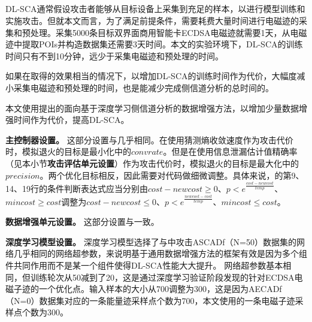 {{	\subsection{\shujuzengqiang}\label{subs:useagmt}
	DL-SCA通常假设攻击者能够从目标设备上采集到充足的样本，以进行模型训练和实施攻击。但就本文而言，为了满足前提条件，需要耗费大量时间进行电磁迹的采集和预处理。采集5000条目标双界面商用智能卡ECDSA电磁迹就需要1天，从电磁迹中提取POIs并构造数据集还需要3天时间。本文的实验环境下，DL-SCA的训练时间只有不到10分钟，远少于采集电磁迹和预处理的时间。
	
	如果在取得的效果相当的情况下，以增加DL-SCA的训练时间作为代价，大幅度减小采集电磁迹和预处理的时间，也是能减少完成侧信道分析的总时间的。
	
	本文使用提出的面向基于深度学习侧信道分析的数据增强方法，以增加少量数据增强时间作为代价，提高DL-SCA\zyx 。
	
	\textbf{主控制器设置。}
	这部分设置与几乎相同。在使用猜测熵收敛速度作为攻击代价时，模拟退火的目标是最小化中的$convrate$。但是在使用信息泄漏估计值精确率（见本小节\textbf{攻击评估单元设置}）作为攻击代价时，模拟退火的目标是最大化中的$precision$。两个优化目标相反，因此需要对代码做细微调整。具体来说，的第9、14、19行的条件判断表达式应当分别由$cost-newcost\ge0$、$p<e^{\frac{cost-newcost}{temp}}$、$mincost\ge cost$调整为$cost-newcost\le0$、$p<e^{\frac{newcost-cost}{temp}}$、$mincost\le cost$。
	
	\textbf{数据增强单元设置。}
	这部分设置与一致。
	
	\textbf{深度学习模型设置。}
	深度学习模型选择了与中攻击ASCADf（N=50）数据集的网络几乎相同的网络超参数，来说明基于通用数据增强方法的框架有效是因为多个组件共同作用而不是某一个组件使得DL-SCA性能大大提升。
	网络超参数基本相同，但训练轮次从50减到了20，这是通过深度学习验证阶段发现的针对ECDSA电磁子迹的一个优化点。输入样本的大小从700调整为300，这是因为AECADf（N=0）数据集对应的一条能量迹采样点个数为700，本文使用的一条电磁子迹采样点个数为300。
	
	
}}

